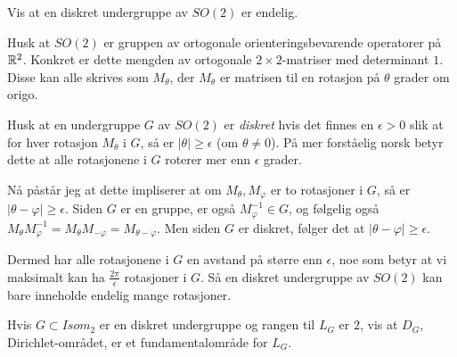 \documentclass[11pt, norsk]{article}
\begin{document}
\begin{oppg}
Vis at en diskret undergruppe av $SO(2)$ er endelig.
\end{oppg}
\begin{losn}
Husk at $SO(2)$ er gruppen av ortogonale orienteringsbevarende operatorer på $\mathbb{R}^2$. Konkret er dette mengden av ortogonale $2 \times 2$-matriser med determinant $1$. Disse kan alle skrives som $M_\theta$, der $M_\theta$ er matrisen til en rotasjon på $\theta$ grader om origo.

Husk at en undergruppe $G$ av $SO(2)$ er \emph{diskret} hvis det finnes en $\epsilon > 0$ slik at for hver rotasjon $M_\theta$ i $G$, så er $\lvert \theta \rvert \geq \epsilon$ (om $\theta \neq 0$). På mer forståelig norsk betyr dette at alle rotasjonene i $G$ roterer mer enn $\epsilon$ grader.

Nå påstår jeg at dette impliserer at om $M_\theta,M_\varphi$ er to rotasjoner i $G$, så er $\lvert\theta - \varphi\rvert \geq \epsilon$. Siden $G$ er en gruppe, er også $M_\varphi^{-1} \in G$, og følgelig også $M_{\theta}M_{\varphi}^{-1} = M_\theta M_{-\varphi}=M_{\theta-\varphi}$. Men siden $G$ er diskret, følger det at $\lvert \theta - \varphi\rvert \geq \epsilon$.

Dermed har alle rotasjonene i $G$ en avstand på større enn $\epsilon$, noe som betyr at vi maksimalt kan ha $\frac{2\pi}{\epsilon}$ rotasjoner i $G$. Så en diskret undergruppe av $SO(2)$ kan bare inneholde endelig mange rotasjoner.
\end{losn}

\begin{oppg}
 Hvis $G \subset Isom_2$ er en diskret undergruppe og rangen til $L_G$ er $2$, vis at $D_G$, Dirichlet-området, er et fundamentalområde for $L_G$.
\end{oppg}
\end{document}
